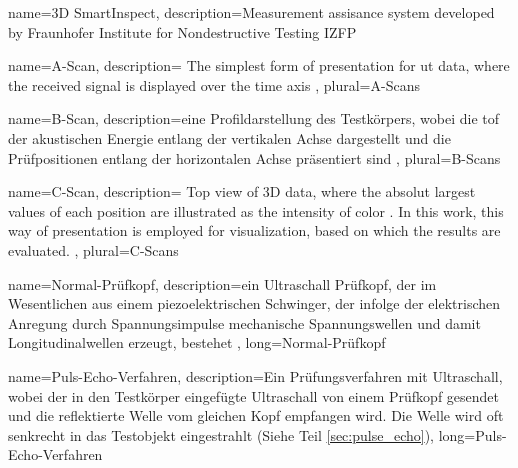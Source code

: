  { name={3D SmartInspect}, description={Measurement assisance system developed by Fraunhofer Institute for Nondestructive Testing IZFP \cite{Krieg18SHMNDT, Valeske20SmartNDE}} }

 { name={A-Scan}, description={
		The simplest form of presentation for \acrshort{ut} data, where the received signal is displayed over the time axis \cite{UTDataPresentation}
	}, plural={A-Scans}}

 { name={B-Scan}, description={eine Profildarstellung des Testkörpers, wobei die \acrshort{tof} der akustischen Energie entlang der vertikalen Achse dargestellt und die Prüfpositionen entlang der horizontalen Achse präsentiert sind \cite{UTDataPresentation}}, plural={B-Scans}}

 { name={C-Scan}, description={
		Top view of 3D data, where the absolut largest values of each position are illustrated as the intensity of color \cite{UTDataPresentation}. In this work, this way of presentation is employed for visualization, based on which the results are evaluated. 
	}, plural={C-Scans}}

 {name={Normal-Prüfkopf}, description={ein Ultraschall Prüfkopf, der im Wesentlichen aus einem piezoelektrischen Schwinger, der infolge der elektrischen Anregung durch Spannungsimpulse mechanische Spannungswellen und damit Longitudinalwellen erzeugt, bestehet \cite{UTNormalPruefkopf}}, long={Normal-Prüfkopf}}

 {name={Puls-Echo-Verfahren}, description={Ein Prüfungsverfahren mit Ultraschall, wobei der in den Testkörper eingefügte Ultraschall von einem Prüfkopf gesendet und die reflektierte Welle vom gleichen Kopf empfangen wird. Die Welle wird oft senkrecht in das Testobjekt eingestrahlt (Siehe Teil \ref{sec:pulse_echo})}, long={Puls-Echo-Verfahren} }




